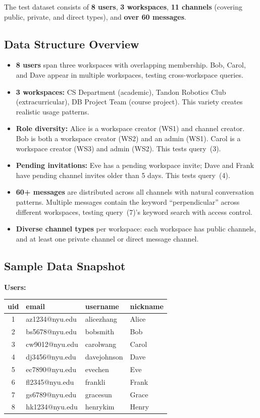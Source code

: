 \documentclass[11pt]{article}
\begin{document}
The test dataset consists of \textbf{8 users}, \textbf{3 workspaces}, \textbf{11 channels} (covering public, private, and direct types), and \textbf{over 60 messages}.

\subsection{Data Structure Overview}

\begin{itemize}
    \item \textbf{8 users} span three workspaces with overlapping membership. Bob, Carol, and Dave appear in multiple workspaces, testing cross-workspace queries.
    \item \textbf{3 workspaces:} CS Department (academic), Tandon Robotics Club (extracurricular), DB Project Team (course project). This variety creates realistic usage patterns.
    \item \textbf{Role diversity:} Alice is a workspace creator (WS1) and channel creator. Bob is both a workspace creator (WS2) and an admin (WS1). Carol is a workspace creator (WS3) and admin (WS2). This tests query~(3).
    \item \textbf{Pending invitations:} Eve has a pending workspace invite; Dave and Frank have pending channel invites older than 5 days. This tests query~(4).
    \item \textbf{60+ messages} are distributed across all channels with natural conversation patterns. Multiple messages contain the keyword ``perpendicular'' across different workspaces, testing query~(7)'s keyword search with access control.
    \item \textbf{Diverse channel types} per workspace: each workspace has public channels, and at least one private channel or direct message channel.
\end{itemize}

\subsection{Sample Data Snapshot}

\noindent\textbf{Users:}
\begin{center}
\tiny
\begin{tabular}{clll}
\toprule
uid & email & username & nickname \\
\midrule
1 & az1234@nyu.edu & alicezhang & Alice \\
2 & bs5678@nyu.edu & bobsmith & Bob \\
3 & cw9012@nyu.edu & carolwang & Carol \\
4 & dj3456@nyu.edu & davejohnson & Dave \\
5 & ec7890@nyu.edu & evechen & Eve \\
6 & fl2345@nyu.edu & frankli & Frank \\
7 & gs6789@nyu.edu & gracesun & Grace \\
8 & hk1234@nyu.edu & henrykim & Henry \\
\bottomrule
\end{tabular}
\end{center}
\end{document}
